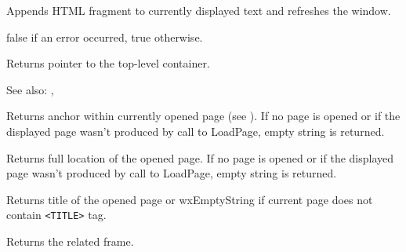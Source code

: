 \label{wxhtmlwindowappendtopage}


Appends HTML fragment to currently displayed text and refreshes the window. 




false if an error occurred, true otherwise.

\label{wxhtmlwindowgetinternalrepresentation}


Returns pointer to the top-level container.

See also: , 

\label{wxhtmlwindowgetopenedanchor}


Returns anchor within currently opened page
(see ). 
If no page is opened or if the displayed page wasn't
produced by call to LoadPage, empty string is returned.


\label{wxhtmlwindowgetopenedpage}


Returns full location of the opened page. If no page is opened or if the displayed page wasn't
produced by call to LoadPage, empty string is returned.

\label{wxhtmlwindowgetopenedpagetitle}


Returns title of the opened page or wxEmptyString if current page does not contain {\tt <TITLE>} tag.

\label{wxhtmlwindowgetrelatedframe}


Returns the related frame.

\label{wxhtmlwindowhistoryback}

